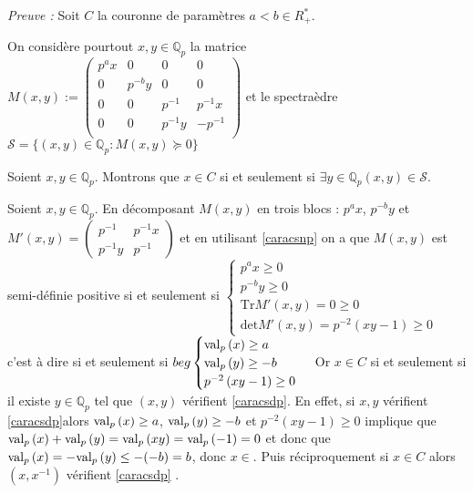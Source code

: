 \textit{Preuve :}
Soit $C$ la couronne de paramètres $a<b \in R^*_+$.

On considère pourtout $x,y \in \mathbb{Q}_{p} $ la matrice  $M(x,y) :=
\begin{pmatrix} 
p^ax & 0 & 0 & 0 \\
0 & p^{-b}y & 0 & 0 \\
0 & 0 & p^{-1} & p^{-1}x \\
0 & 0 & p^{-1}y & - p^{-1}  \\
\end{pmatrix} $ et le spectraèdre $\mathcal{S}= \{(x,y) \in \mathbb{Q}_{p}  : M(x,y) \succeq 0\} $

Soient $x,y \in \mathbb{Q}_{p} $. Montrons que $x \in C$ si et seulement si  $\exists y \in \mathbb{Q}_{p} \left( x,y \right) \in \mathcal{S}$.

Soient $x,y \in \mathbb{Q}_{p} $.
En décomposant $M(x,y)$ en trois blocs : $p^ax$, $p^{-b}y $ et $M'(x,y) = \begin{pmatrix} p^{-1} & p^{-1}x \\ p^{-1} y & p^{-1}\end{pmatrix} $ et en utilisant \ref{caracsnp} on a que $M(x,y)$ est semi-définie positive si et seulement si 
$
\begin{cases}
p^ax \ge 0 \\
p^{-b}y \ge 0\\
\text{Tr}M'\left( x,y \right) = 0 \ge 0\\
\text{det} M'(x,y ) = p^{-2}\left( xy-1 \right)  \ge 0 
\end{cases}
$ 
c'est à dire si et seulement si $beg \begin{cases}
\label{caracsdp} 
	\val\left(x\right)\ge a\\
\val\left(y\right)\ge -b\\
p^{-2} \left( xy-1 \right) \ge 0


\end{cases}$
Or $x \in C$ si et seulement si il existe $y \in \mathbb{Q}_{p} $ tel que $(x, y)$ vérifient \ref{caracsdp}. En effet, si $x, y$ vérifient \ref{caracsdp}alors $\val\left(x\right)\ge a$, $\val\left(y\right)\ge -b$ et $p^{-2} \left( xy-1 \right) \ge 0$ implique que $\val\left(x\right)+\val\left(y\right)=\val\left(xy\right) = \val\left(-1\right) =0$ et donc que $\val\left(x\right)=-\val\left(y\right)\le -(-b)  =b$, donc $x \in $. Puis réciproquement si $x \in C$ alors $(x,x^{-1}) $ vérifient \ref{caracsdp}  .
